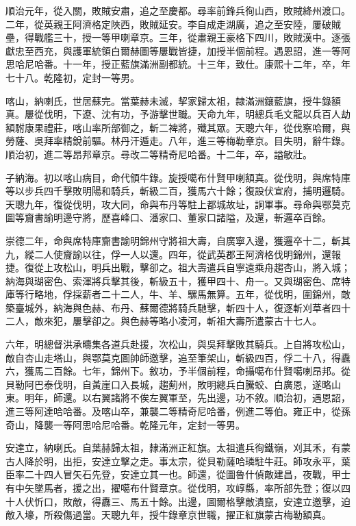 \begin{pinyinscope}
順治元年，從入關，敗賊安肅，追之至慶都。尋率前鋒兵徇山西，敗賊絳州渡口。二年，從英親王阿濟格定陜西，敗賊延安。李自成走湖廣，追之至安陸，屢破賊壘，得戰艦三十，授一等甲喇章京。三年，從肅親王豪格下四川，敗賊漢中。逐張獻忠至西充，與護軍統領白爾赫圖等屢戰皆捷，加授半個前程。遇恩詔，進一等阿思哈尼哈番。十一年，授正藍旗滿洲副都統。十三年，致仕。康熙十二年，卒，年七十八。乾隆初，定封一等男。

喀山，納喇氏，世居蘇完。當葉赫未滅，挈家歸太祖，隸滿洲鑲藍旗，授牛錄額真。屢從伐明，下遼、沈有功，予游擊世職。天命九年，明總兵毛文龍以兵百人劫額駙康果禮莊，喀山率所部御之，斬二裨將，殲其眾。天聰六年，從伐察哈爾，與勞薩、吳拜率精銳前驅。林丹汗遁走。八年，進三等梅勒章京。目失明，辭牛錄。順治初，進二等昂邦章京。尋改二等精奇尼哈番。十二年，卒，謚敏壯。

子納海。初以喀山病目，命代領牛錄。旋授噶布什賢甲喇額真。從伐明，與席特庫等以步兵四千擊敗明陽和騎兵，斬級二百，獲馬六十餘；復設伏宣府，捕明邏騎。天聰九年，復從伐明，攻大同，命與布丹等駐上都城故址，詗軍事。尋命與鄂莫克圖等齎書諭明邊守將，歷喜峰口、潘家口、董家口諸隘，及還，斬邏卒百餘。

崇德二年，命與席特庫齎書諭明錦州守將祖大壽，自廣寧入邊，獲邏卒十二，斬其九，縱二人使齎諭以往，俘一人以還。四年，從武英郡王阿濟格伐明錦州，還報捷。復從上攻松山，明兵出戰，擊卻之。祖大壽遣兵自寧遠乘舟趨杏山，將入城；納海與瑚密色、索渾將兵擊其後，斬級五十，獲甲四十、舟一。又與瑚密色、席特庫等行略地，俘採薪者二十二人，牛、羊、騾馬無算。五年，從伐明，圍錦州，敵築臺城外，納海與色赫、布丹、蘇爾德將騎兵馳擊，斬四十人，復逐斬刈草者四十二人，敵來犯，屢擊卻之。與色赫等略小凌河，斬祖大壽所遣蒙古十七人。

六年，明總督洪承疇集各道兵赴援，次松山，與吳拜擊敗其騎兵。上自將攻松山，敵自杏山走塔山，與鄂莫克圖帥師邀擊，追至筆架山，斬級四百，俘二十八，得纛六，獲馬二百餘。七年，錦州下。敘功，予半個前程，命攝噶布什賢噶喇昂邦。從貝勒阿巴泰伐明，自黃崖口入長城，趨薊州，敗明總兵白騰蛟、白廣恩，遂略山東。明年，師還。以右翼諸將不俟左翼軍至，先出邊，功不敘。順治初，遇恩詔，進三等阿達哈哈番。及喀山卒，兼襲二等精奇尼哈番，例進二等伯。雍正中，從孫奇山，降襲一等阿思哈尼哈番。乾隆元年，定封一等男。

安達立，納喇氏。自葉赫歸太祖，隸滿洲正紅旗。太祖遣兵徇鐵嶺，刈其禾，有蒙古人降於明，出拒，安達立擊之走。事太宗，從貝勒薩哈璘駐牛莊。師攻永平，葉臣率二十四人冒矢石先登，安達立其一也。師還，從圖魯什偵敵建昌，夜戰，甲士有中矢墜馬者，援之出，擢噶布什賢章京。從伐明，攻崞縣，率所部先登；復以四十人伏忻口，敗敵，得纛三、馬五十餘。出邊，圖爾格擊敵潰竄，安達立邀擊，迫敵入壕，所殺傷過當。天聰九年，授牛錄章京世職，擢正紅旗蒙古梅勒額真。


\end{pinyinscope}
